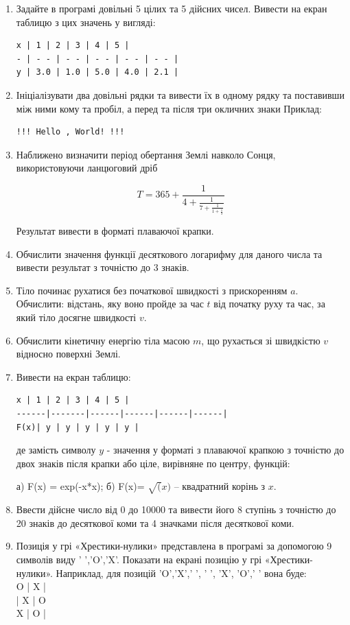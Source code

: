 \documentclass[a5paper,titlepage,openany,twoside,draft]{book_unv}%
\begin{document}
\begin{enumerate}
\def\labelenumi{\arabic{enumi}.}
\setcounter{enumi}{9}
\item
Задайте в програмі довільні 5 цілих та 5 дійсних чисел. Вивести на екран таблицю
з цих значень у вигляді:
\begin{verbatim}
x | 1 | 2 | 3 | 4 | 5 |
- | - - | - - | - - | - - | - - |
y | 3.0 | 1.0 | 5.0 | 4.0 | 2.1 |
\end{verbatim}

\item
Ініціалізувати два довільні рядки та вивести їх в одному рядку та
поставивши між ними кому та пробіл, а перед та після три окличних знаки
Приклад:
\begin{verbatim}
!!! Hello , World! !!!
\end{verbatim}
\item
Наближено визначити період обертання Землі навколо Сонця,
використовуючи ланцюговий дріб

\[T = 365 + \frac{1}{4 + \frac{1}{7 + \frac{1}{1 + \frac{1}{3}}}}\]

Результат вивести в форматі плаваючої крапки.

\item
Обчислити значення функції десяткового логарифму для даного числа та
вивести результат з точністю до 3 знаків.
\item
Тіло починає рухатися без початкової швидкості з прискоренням
\(a\). Обчислити: відстань, яку воно пройде за час \(t\) від початку руху та
час, за який тіло досягне швидкості \(v\).

\item
Обчислити кінетичну енергію тіла масою \(m\), що рухається зі
швидкістю \(v\) відносно поверхні Землі.
\item
Вивести на екран таблицю:
\begin{verbatim}
x | 1 | 2 | 3 | 4 | 5 |
------|-------|------|------|------|------|
F(x)| y | y | y | y | y |
\end{verbatim}

де замість символу $y$ - значення у форматі з плаваючої крапкою з точністю
до двох знаків після крапки або ціле, вирівняне по центру, функцій:

а) F(x) = exp(-x*x); б) F(x)= $\sqrt(x)$ -- квадратний корінь з $x$.

\item
Ввести дійсне число від 0 до 10000 та вивести його 8 ступінь з
точністю до 20 знаків до десяткової коми та 4 значками після
десяткової коми.

\item
Позиція у грі «Хрестики-нулики» представлена в програмі за допомогою 9 символів виду ' ','O','X'.
Показати на екрані позицію у грі «Хрестики-нулики».
Наприклад, для позицій 'O','X',' ', ' ', 'X', 'O',' ' вона буде:\\
O | X | \hspace*{7pt} \\
\hspace*{7pt} | X | O \\
X | O | \hspace*{7pt} \\

\end{enumerate}
\end{document}
